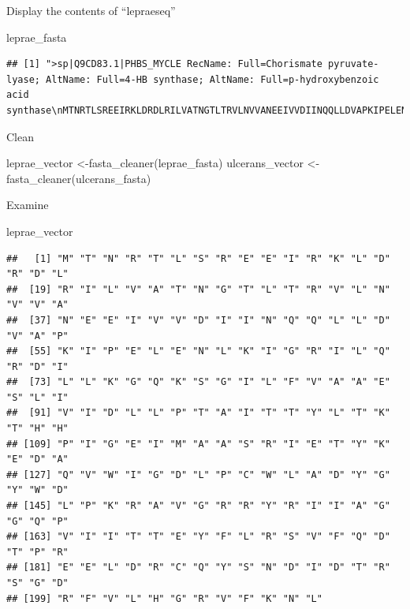 \documentclass[
]{book}
\newenvironment{Shaded}{\begin{snugshade}}{\end{snugshade}}
\newcommand{\FunctionTok}[1]{\textcolor[rgb]{0.00,0.00,0.00}{#1}}
\newcommand{\NormalTok}[1]{#1}
\newcommand{\OtherTok}[1]{\textcolor[rgb]{0.56,0.35,0.01}{#1}}
\begin{document}
Display the contents of ``lepraeseq''

\begin{Shaded}
\begin{Highlighting}[]
\NormalTok{leprae\_fasta}
\end{Highlighting}
\end{Shaded}

\begin{verbatim}
## [1] ">sp|Q9CD83.1|PHBS_MYCLE RecName: Full=Chorismate pyruvate-lyase; AltName: Full=4-HB synthase; AltName: Full=p-hydroxybenzoic acid synthase\nMTNRTLSREEIRKLDRDLRILVATNGTLTRVLNVVANEEIVVDIINQQLLDVAPKIPELENLKIGRILQR\nDILLKGQKSGILFVAAESLIVIDLLPTAITTYLTKTHHPIGEIMAASRIETYKEDAQVWIGDLPCWLADY\nGYWDLPKRAVGRRYRIIAGGQPVIITTEYFLRSVFQDTPREELDRCQYSNDIDTRSGDRFVLHGRVFKNL\n\n"
\end{verbatim}

Clean

\begin{Shaded}
\begin{Highlighting}[]
\NormalTok{leprae\_vector }\OtherTok{\textless{}{-}}\FunctionTok{fasta\_cleaner}\NormalTok{(leprae\_fasta)}
\NormalTok{ulcerans\_vector }\OtherTok{\textless{}{-}}\FunctionTok{fasta\_cleaner}\NormalTok{(ulcerans\_fasta)}
\end{Highlighting}
\end{Shaded}

Examine

\begin{Shaded}
\begin{Highlighting}[]
\NormalTok{leprae\_vector}
\end{Highlighting}
\end{Shaded}

\begin{verbatim}
##   [1] "M" "T" "N" "R" "T" "L" "S" "R" "E" "E" "I" "R" "K" "L" "D" "R" "D" "L"
##  [19] "R" "I" "L" "V" "A" "T" "N" "G" "T" "L" "T" "R" "V" "L" "N" "V" "V" "A"
##  [37] "N" "E" "E" "I" "V" "V" "D" "I" "I" "N" "Q" "Q" "L" "L" "D" "V" "A" "P"
##  [55] "K" "I" "P" "E" "L" "E" "N" "L" "K" "I" "G" "R" "I" "L" "Q" "R" "D" "I"
##  [73] "L" "L" "K" "G" "Q" "K" "S" "G" "I" "L" "F" "V" "A" "A" "E" "S" "L" "I"
##  [91] "V" "I" "D" "L" "L" "P" "T" "A" "I" "T" "T" "Y" "L" "T" "K" "T" "H" "H"
## [109] "P" "I" "G" "E" "I" "M" "A" "A" "S" "R" "I" "E" "T" "Y" "K" "E" "D" "A"
## [127] "Q" "V" "W" "I" "G" "D" "L" "P" "C" "W" "L" "A" "D" "Y" "G" "Y" "W" "D"
## [145] "L" "P" "K" "R" "A" "V" "G" "R" "R" "Y" "R" "I" "I" "A" "G" "G" "Q" "P"
## [163] "V" "I" "I" "T" "T" "E" "Y" "F" "L" "R" "S" "V" "F" "Q" "D" "T" "P" "R"
## [181] "E" "E" "L" "D" "R" "C" "Q" "Y" "S" "N" "D" "I" "D" "T" "R" "S" "G" "D"
## [199] "R" "F" "V" "L" "H" "G" "R" "V" "F" "K" "N" "L"
\end{verbatim}
\end{document}
